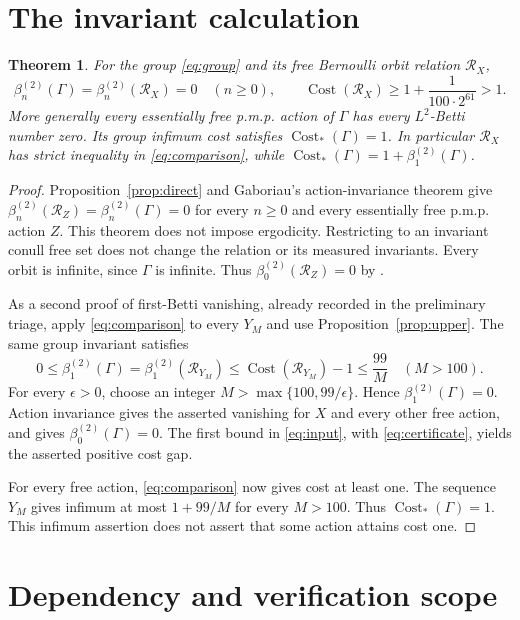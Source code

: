 \documentclass[11pt]{article}
\newcommand{\Cost}{\operatorname{Cost}}
\newcommand{\betti}[1]{\beta_{#1}^{(2)}}
\newcommand{\RR}{\mathcal R}
\newtheorem{theorem}{Theorem}
\theoremstyle{remark}\newtheorem{remark}[theorem]{Remark}
\begin{document}
\section{The invariant calculation}

\begin{theorem}\label{thm:main}
For the group \eqref{eq:group} and its free Bernoulli orbit relation $\RR_X$,
\[
 \betti n(\Gamma)=\betti n(\RR_X)=0\quad(n\geq0),
 \qquad \Cost(\RR_X)\geq1+\frac1{100\cdot2^{61}}>1.
\]
More generally every essentially free p.m.p. action of $\Gamma$ has every $L^2$-Betti number zero. Its group infimum cost satisfies $\Cost_*(\Gamma)=1$. In particular $\RR_X$ has strict inequality in \eqref{eq:comparison}, while $\Cost_*(\Gamma)=1+\betti1(\Gamma)$.
\end{theorem}
\begin{proof}
Proposition~\ref{prop:direct} and Gaboriau's action-invariance theorem \cite[Corollary~3.16, p.~126]{gab02} give $\betti n(\RR_Z)=\betti n(\Gamma)=0$ for every $n\geq0$ and every essentially free p.m.p. action $Z$. This theorem does not impose ergodicity. Restricting to an invariant conull free set does not change the relation or its measured invariants. Every orbit is infinite, since $\Gamma$ is infinite. Thus $\betti0(\RR_Z)=0$ by \cite[Properties~3.15(1), p.~126]{gab02}.

As a second proof of first-Betti vanishing, already recorded in the preliminary triage, apply \eqref{eq:comparison} to every $Y_M$ and use Proposition~\ref{prop:upper}. The same group invariant satisfies
\[
 0\leq\betti1(\Gamma)=\betti1(\RR_{Y_M})
 \leq\Cost(\RR_{Y_M})-1\leq\frac{99}{M}\quad(M>100).
\]
For every $\epsilon>0$, choose an integer $M>\max\{100,99/\epsilon\}$. Hence $\betti1(\Gamma)=0$. Action invariance gives the asserted vanishing for $X$ and every other free action, and gives $\betti0(\Gamma)=0$. The first bound in \eqref{eq:input}, with \eqref{eq:certificate}, yields the asserted positive cost gap.

For every free action, \eqref{eq:comparison} now gives cost at least one. The sequence $Y_M$ gives infimum at most $1+99/M$ for every $M>100$. Thus $\Cost_*(\Gamma)=1$. This infimum assertion does not assert that some action attains cost one.
\end{proof}

\section{Dependency and verification scope}
\end{document}
